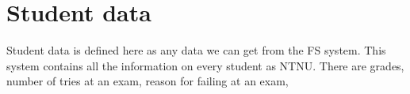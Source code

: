 \section{Student data}
Student data is defined here as any data we can get from the FS system. 
This system contains all the information on every student as NTNU.
There are grades, number of tries at an exam, reason for failing at an exam, 